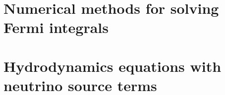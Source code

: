 \documentclass[12pt,twoside]{report}
\begin{document}
\chapter{Numerical methods for solving Fermi integrals}


\chapter{Hydrodynamics equations with neutrino source terms}



\begin{comment}
\chapter*{Code features}
\begin{itemize}


\end{comment}
\end{document}
